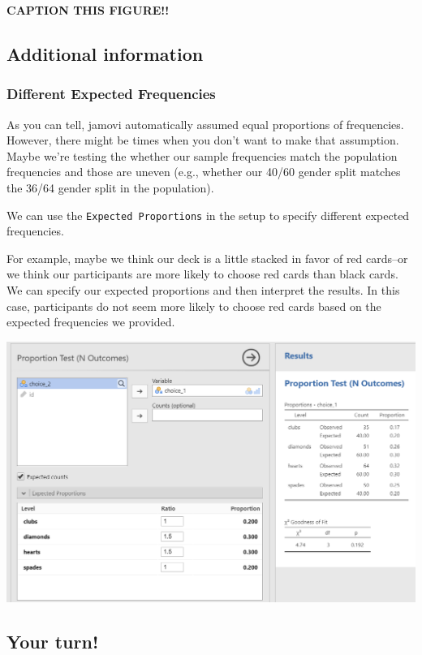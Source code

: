 \documentclass[
]{book}
\begin{document}
\label{fig:unnamed-chunk-1}\textbf{CAPTION THIS FIGURE!!}

\hypertarget{additional-information-1}{%
\subsection{Additional information}\label{additional-information-1}}

\hypertarget{different-expected-frequencies}{%
\subsubsection{Different Expected Frequencies}\label{different-expected-frequencies}}

As you can tell, jamovi automatically assumed equal proportions of frequencies. However, there might be times when you don't want to make that assumption. Maybe we're testing the whether our sample frequencies match the population frequencies and those are uneven (e.g., whether our 40/60 gender split matches the 36/64 gender split in the population).

We can use the \texttt{Expected\ Proportions} in the setup to specify different expected frequencies.

For example, maybe we think our deck is a little stacked in favor of red cards--or we think our participants are more likely to choose red cards than black cards. We can specify our expected proportions and then interpret the results. In this case, participants do not seem more likely to choose red cards based on the expected frequencies we provided.

\includegraphics{images/09-chi-square/chi-square_results2.png}

\hypertarget{your-turn-3}{%
\subsection{Your turn!}\label{your-turn-3}}
\end{document}
